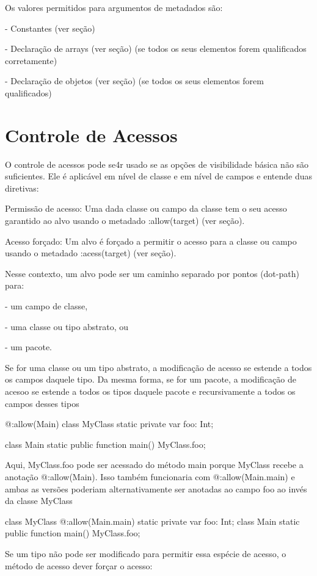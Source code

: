 {Os valores permitidos para argumentos de metadados são:

- Constantes (ver seção)

- Declaração de arrays (ver seção) (se todos os seus elementos forem qualificados corretamente)

- Declaração de objetos (ver seção) (se todos os seus elementos forem qualificados)

\section{Controle de Acessos}

O controle de acessos pode se4r usado se as opções de visibilidade básica não são suficientes. Ele é aplicável em nível de classe e em nível de campos e entende duas diretivas:

Permissão de acesso: Uma dada classe ou campo da classe tem o seu acesso garantido ao alvo usando o metadado :allow(target) (ver seção).

Acesso forçado: Um alvo é forçado a permitir o acesso para a classe ou campo usando o metadado :acess(target) (ver seção).

Nesse contexto, um alvo pode ser um caminho separado por pontos (dot-path) para:

  - um campo de classe,

  - uma classe ou tipo abstrato, ou

  - um pacote.

Se for uma classe ou um tipo abstrato, a modificação de acesso se estende a todos os campos daquele tipo. Da mesma forma, se for um pacote, a modificação de acesoo se estende a todos os tipos daquele pacote e recursivamente a todos os campos desses tipos

@:allow(Main)
class MyClass {
    static private var foo: Int;
}

class Main {
    static public function main() {
        MyClass.foo;
    }  
}

Aqui, MyClass.foo pode ser acessado do método main porque MyClass recebe a anotação @:allow(Main). Isso também funcionaria com @:allow(Main.main) e ambas as versões poderiam alternativamente ser anotadas ao campo foo ao invés da classe MyClass

class MyClass {
    @:allow(Main.main)
    static private var foo: Int;
}
class Main {
    static public function main() {
        MyClass.foo;
    } 
}

Se um tipo não pode ser modificado para permitir essa espécie de acesso, o método de acesso dever forçar o acesso:

}

